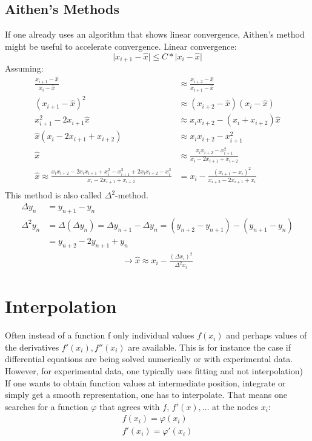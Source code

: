 \section{Aithen's Methods}\label{sec:aithen's-methods}
If one already uses an algorithm that shows linear convergence, Aithen's method might be useful to
accelerate convergence.
Linear convergence:
\begin{equation*}
    \lvert x_{i+1} - \hat{x} \rvert \leq C * \lvert x_i - \hat{x} \rvert
\end{equation*}
Assuming:
\begin{align*}
    \frac{ x_{i+1}-\hat{x} }{x_i - \hat{x}} &\approx
    \frac{ x_{i+2}-\hat{x}}{x_{i+1}-\hat{x}}\\
    (x_{i+1}-\hat{x})^2 &\approx (x_{i+2}-\hat{x})(x_i-\hat{x})\\
    x_{i+1}^2-2x_{i+1}\hat{x} &\approx x_i x_{i+2}-(x_i+x_{i+2})\hat{x}\\
    \hat{x}(x_i-2x_{i+1}+x_{i+2}) &\approx x_i x_{i+2}- x_{i+1}^2\\
    \hat{x} &\approx \frac{x_i x_{i+2}-x_{i+1}^2}{x_i-2x_{i+1}+ x_{i+2}}\\
    \hat{x}\approx\frac{x_i x_{i+2}-2x_i x_{i+1}+x_i^2-x_{i+1}^2+2x_i x_{i+2}-x_i^2}{x_i-2x_{i+1}+x_{i+2}}&= x_i-\frac{(x_{i+1}-x_i)^2}{x_{i+2}-2x_{i+1}+x_i}\\
\end{align*}
This method is also called $\Delta^2$-method.
\begin{align*}
    \Delta y_n &= y_{n+1}-y_n\\
    \Delta^2 y_n &= \Delta(\Delta y_n) = \Delta y_{n+1}-\Delta y_n = (y_{n+2}-y_{n+1})-(y_{n+1}-y_n)\\
    &=y_{n+2} -2y_{n+1}+y_n
\end{align*}
\begin{align*}
    \to \hat{x}\approx x_i - \frac{(\Delta x_i)^2}{\Delta^2 x_i}
\end{align*}


\chapter{Interpolation}\label{ch:interpolation}
Often instead of a function f only individual values $f(x_i)$ and
perhaps values of the derivatives $f'(x_i), f''(x_i)$ are available.
This is for instance the case if differential equations are being solved
numerically or with experimental data.
However, for experimental data, one typically uses fitting and not interpolation)
If one wants to obtain function values at intermediate position, integrate or
simply get a smooth representation, one has to interpolate.
That means one searches for a function $\varphi$ that agrees with $f$, $f'(x), \ldots$
at the nodes $x_i$:
\begin{align*}
    f(x_i)=\varphi(x_i)\\
    f'(x_i)=\varphi'(x_i)
\end{align*}


